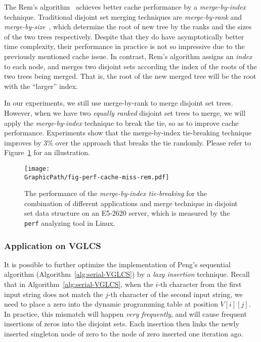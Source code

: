 The Rem's algorithm~\cite{dijkstra1976a} achieves better cache
performance by a {\em merge-by-index} technique.  Traditional disjoint
set merging techniques are {\em merge-by-rank} and {\em
merge-by-size}~\cite{Tarjan1975EfficiencyOA}, which determine the root
of new tree by the ranks and the sizes of the two trees respectively.
Despite that they do have asymptotically better time complexity, their
performance in practice is not so impressive due to the previously
mentioned cache issue.  In contrast, Rem's algorithm assigns an {\em
index} to each node, and merges two disjoint sets according the index of
the roots of the two trees being merged.  That is, the root of the new
merged tree will be the root with the ``larger'' index.

In our experiments, we still use merge-by-rank to merge disjoint set
trees.  However, when we have two {\em equally ranked} disjoint set
trees to merge, we will apply the {\em merge-by-index} technique to
break the tie, so as to improve cache performance.  Experiments show
that the merge-by-index tie-breaking technique improves by 3\% over the
approach that breaks the tie randomly.  Please refer to
Figure~\ref{fig:fig-perf-cache-miss-rem} for an illustration.

\begin{figure}
  \centering
  \texttt{[image: \\GraphicPath/fig-perf-cache-miss-rem.pdf]}
  \caption{The performance of the {\em merge-by-index tie-breaking} for
  the combination of different applications and merge technique in
  disjoint set data structure on an E5-2620 server, which is measured by
  the {\tt perf} analyzing tool in Linux.}
  \label{fig:fig-perf-cache-miss-rem}
\end{figure}

\subsubsection{Application on VGLCS}


It is possible to further optimize the implementation of Peng's
sequential algorithm (Algorithm~\ref{alg:serial-VGLCS}) by a {\em lazy
insertion} technique.  Recall that in Algorithm~\ref{alg:serial-VGLCS},
when the $i$-th character from the first input string does not match the
$j$-th character of the second input string, we need to place a zero
into the dynamic programming table at position $V[i][j]$.  In practice,
this mismatch will happen {\em very frequently}, and will cause frequent
insertions of zeros into the disjoint sets.  Each insertion then links
the newly inserted singleton node of zero to the node of zero inserted
one iteration ago.

